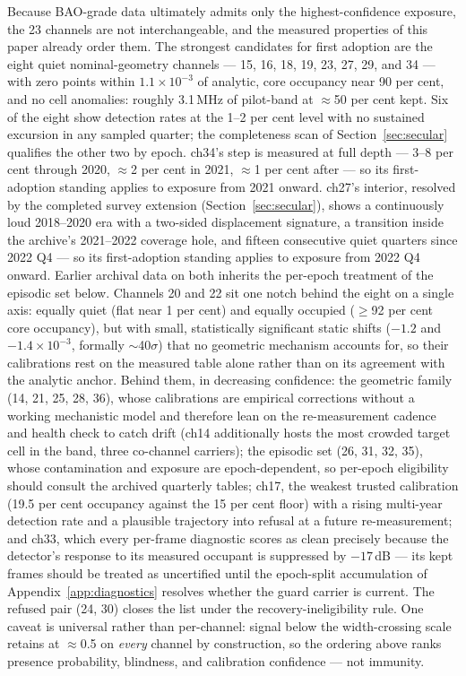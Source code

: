 Because BAO-grade data ultimately admits only the highest-confidence
exposure, the 23 channels are not interchangeable, and the measured
properties of this paper already order them. The
strongest candidates for first adoption are the eight quiet
nominal-geometry channels --- 15, 16, 18, 19, 23, 27, 29, and 34 ---
with zero points within $1.1\times10^{-3}$ of analytic, core occupancy
near 90 per cent, and no cell anomalies: roughly 3.1\,MHz of
pilot-band at $\approx$50 per cent kept. Six of the eight show
detection rates at the 1--2 per cent level with no sustained excursion
in any sampled quarter; the completeness scan of
Section~\ref{sec:secular} qualifies the other two by epoch. ch34's
step is measured at full depth --- 3--8 per cent through 2020,
$\approx$2 per cent in 2021, $\approx$1 per cent after --- so its
first-adoption standing applies to exposure from 2021 onward. ch27's
interior, resolved by the completed survey extension
(Section~\ref{sec:secular}), shows a continuously loud 2018--2020 era
with a two-sided displacement signature, a transition inside the
archive's 2021--2022 coverage hole, and fifteen consecutive quiet
quarters since 2022 Q4 --- so its first-adoption standing applies to
exposure from 2022 Q4 onward. Earlier archival data on both inherits
the per-epoch treatment of the episodic set below. Channels 20 and 22 sit one notch behind the eight on a
single axis: equally quiet (flat near 1 per cent) and equally occupied
($\ge$92 per cent core occupancy), but with small, statistically
significant static shifts ($-1.2$ and $-1.4\times10^{-3}$, formally
$\sim$40$\sigma$) that no geometric mechanism accounts for, so their
calibrations rest on the measured table alone rather than on its
agreement with the analytic anchor. Behind them, in decreasing
confidence: the geometric family (14, 21, 25, 28, 36), whose
calibrations are empirical corrections without a working mechanistic
model and therefore lean on the re-measurement cadence and health
check to catch drift (ch14 additionally hosts the most crowded target
cell in the band, three co-channel carriers); the episodic set (26,
31, 32, 35), whose contamination and exposure are epoch-dependent, so
per-epoch eligibility should consult the archived quarterly tables;
ch17, the weakest trusted calibration (19.5 per cent occupancy against
the 15 per cent floor) with a rising multi-year detection rate and a
plausible trajectory into refusal at a future re-measurement; and
ch33, which every per-frame diagnostic scores as clean precisely
because the detector's response to its measured occupant is suppressed
by $-17$\,dB --- its kept frames should be treated as uncertified
until the epoch-split accumulation of
Appendix~\ref{app:diagnostics} resolves whether the guard carrier is
current. The refused pair (24, 30) closes the list under the
recovery-ineligibility rule. One caveat is universal rather than
per-channel: signal below the width-crossing scale retains at
$\approx$0.5 on \emph{every} channel by construction, so the ordering
above ranks presence probability, blindness, and calibration
confidence --- not immunity.

